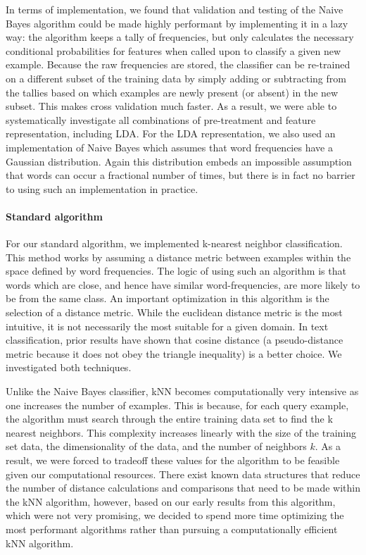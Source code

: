 \documentclass[conference,letterpaper]{IEEEtran}
\begin{document}
In terms of implementation, we found that validation and testing of the Naive 
Bayes algorithm could be made highly performant by implementing it in a 
lazy way: the algorithm keeps a tally of frequencies, but only calculates 
the necessary conditional probabilities for features when called upon to
classify a given new example.  Because the raw frequencies are stored,
the classifier can be re-trained on a different subset of the training data
by simply adding or subtracting from the tallies based on which examples are
newly present (or absent) in the new subset.  This makes cross validation much
faster.  As a result, we were able to systematically investigate all 
combinations of pre-treatment and feature representation, including LDA.
For the LDA representation, we also used an implementation of Naive Bayes 
which assumes that word frequencies have a Gaussian distribution.  Again
this distribution embeds an impossible assumption that words can occur a 
fractional number of times, but there is in fact no barrier to using 
such an implementation in practice.

\paragraph{Standard algorithm}
For our standard algorithm, we implemented k-nearest neighbor classification.
This method works by assuming a distance metric between examples within the
space defined by word frequencies.  The logic of using such an algorithm is 
that words which are close, and hence have similar word-frequencies, are more
likely to be from the same class.  An important optimization in this 
algorithm is the selection of a distance metric.  While the euclidean distance
metric is the most intuitive, it is not necessarily the most suitable for
a given domain.  In text classification, prior results have shown that 
cosine distance (a pseudo-distance metric because it does not obey the
triangle inequality) is a better choice.  We investigated both techniques.

Unlike the Naive Bayes classifier, kNN becomes computationally very intensive
as one increases the number of examples.  This is because, for each query
example, the algorithm must search through the entire training data set to
find the k nearest neighbors.  This complexity increases linearly with the
size of the training set data, the dimensionality of the data, and the 
number of neighbors $k$.  As a result, we were forced to tradeoff these values
for the algorithm to be feasible given our computational resources.  There
exist known data structures that reduce the number of distance calculations and
comparisons that need to be made within the kNN algorithm, however, based on
our early results from this algorithm, which were not very promising, we 
decided to spend more time optimizing the most performant algorithms rather
than pursuing a computationally efficient kNN algorithm.
\end{document}
